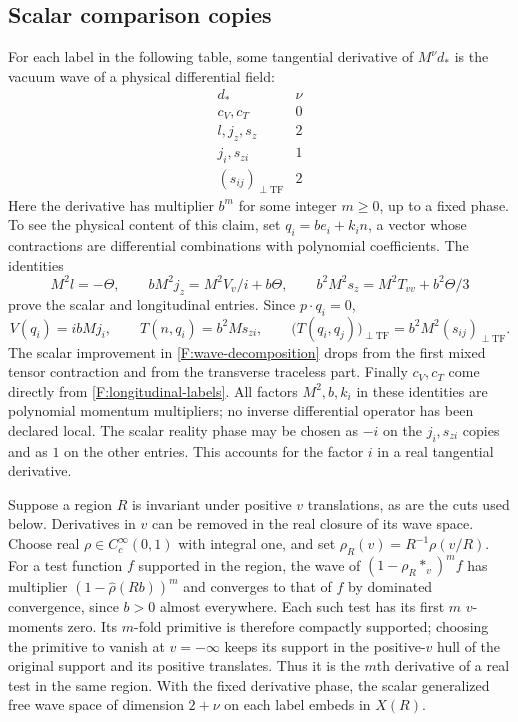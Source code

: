 \subsection{Scalar comparison copies}
\label{F:scalar-comparisons}

For each label in the following table, some tangential derivative of
$M^\nu d_*$ is the vacuum wave of a physical differential field:
\begin{equation}\label{F:comparison-table}
 \begin{array}{c|c}
 d_*&\nu\\\hline
 c_V,c_T&0\\
 l,j_z,s_z&2\\
 j_i,s_{zi}&1\\
 (s_{ij})_{\perp\mathrm{TF}}&2
 \end{array}
\end{equation}
Here the derivative has multiplier $b^m$ for some integer $m\ge0$,
up to a fixed phase. To see the physical content of this claim, set
$q_i=be_i+k_i n$, a vector whose contractions are differential
combinations with polynomial coefficients. The identities
\[
 M^2l=-\Theta,\qquad
 bM^2j_z=M^2V_v/i+b\Theta,\qquad
 b^2M^2s_z=M^2T_{vv}+b^2\Theta/3
\]
prove the scalar and longitudinal entries. Since $p\cdot q_i=0$,
\[
 V(q_i)=ibMj_i,\qquad T(n,q_i)=b^2Ms_{zi},\qquad
 \bigl(T(q_i,q_j)\bigr)_{\perp\mathrm{TF}}
       =b^2M^2(s_{ij})_{\perp\mathrm{TF}}.
\]
The scalar improvement in \eqref{F:wave-decomposition} drops from the
first mixed tensor contraction and from the transverse traceless part.
Finally $c_V,c_T$ come directly from \eqref{F:longitudinal-labels}.
All factors $M^2,b,k_i$ in these identities are polynomial momentum
multipliers; no inverse differential operator has been declared local.
The scalar reality phase may be chosen as $-i$ on the $j_i,s_{zi}$
copies and as $1$ on the other entries. This accounts for the factor
$i$ in a real tangential derivative.

Suppose a region $R$ is invariant under positive
$v$ translations, as are the cuts used below. Derivatives in $v$ can be
removed in the real closure of its wave space. Choose real
$\rho\in C_c^\infty(0,1)$ with integral one, and set
$\rho_R(v)=R^{-1}\rho(v/R)$. For a test function $f$ supported in the
region, the wave of
$(1-\rho_R*_{v})^m f$ has multiplier
$(1-\widehat\rho(Rb))^m$ and converges to that of $f$ by dominated
convergence, since $b>0$ almost everywhere. Each such test has its first
$m$ $v$-moments zero. Its $m$-fold primitive is therefore compactly
supported; choosing the primitive to vanish at $v=-\infty$ keeps its
support in the positive-$v$ hull of the original support and its positive
translates. Thus it is the $m$th derivative of a real test in the same
region. With the fixed derivative phase, the scalar generalized free
wave space of dimension $2+\nu$ on each label embeds in $X(R)$.

